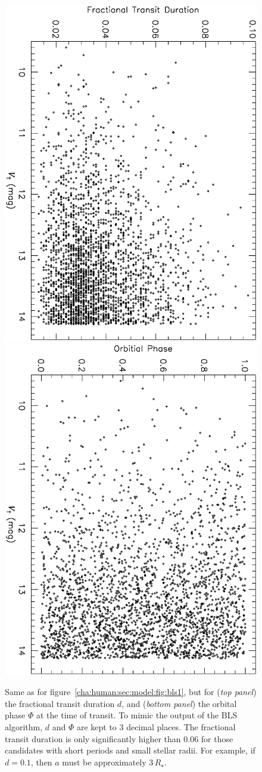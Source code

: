 \begin{figure}
\begin{center}
\centering
\includegraphics[width=.55\textwidth, angle=90]{7_bls_c}\\
\includegraphics[width=.55\textwidth, angle=90]{7_bls_d}\\
\caption[Randomized values for final two BLS parameters]{%
Same as for figure~\ref{cha:human:sec:model:fig:bls1}, but for %
({\it top panel}) the fractional transit duration $d$, and %
({\it bottom panel})  the orbital phase $\Phi$ at the time of transit.
To mimic the output of the BLS algorithm, $d$ and $\Phi$ are kept to 3 decimal places.
The fractional transit duration is only significantly higher than $0.06$ for those candidates with short periods and small stellar radii. 
For example, if $d=0.1$, then $a$ must be approximately $3\,R_{\star}$. %
%
}
\label{cha:human:sec:model:fig:bls2}
\end{center}
\end{figure}

